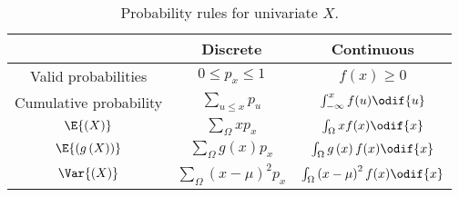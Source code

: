 \documentclass{article}
\begin{document}
\begin{minipage}{126.1962963mm}
    \begin{table}[H]
        \centering
        \begin{tabular}{c c c }
            \toprule
                                                     & \textbf{Discrete}                              & \textbf{Continuous}                                    \\
            \midrule
            Valid probabilities                      & \(0 \leq p_x \leq 1\)                          & \(f(x) \geq 0\)                                        \\
            Cumulative probability                   & \(\sum_{u \leq x} p_u\)                        & \(\int_{-\infty}^{x} f(u) \odif{u}\)                   \\
            \(\E{\left( X \right)}\)                 & \(\sum_{\Omega} xp_x\)                         & \(\int_{\Omega} xf(x)\odif{x}\)                        \\
            \(\E{\left( g\left( X \right) \right)}\) & \(\sum_{\Omega} g\left( x \right)p_x\)         & \(\int_{\Omega} g\left( x \right)f(x)\odif{x}\)        \\
            \(\Var{\left( X \right)}\)               & \(\sum_{\Omega} \left( x - \mu \right)^2 p_x\) & \(\int_{\Omega} \left( x - \mu \right)^2f(x)\odif{x}\) \\
            \bottomrule
        \end{tabular}
        \caption{Probability rules for univariate \(X\).} %
    \end{table}
\end{minipage}
\end{document}
